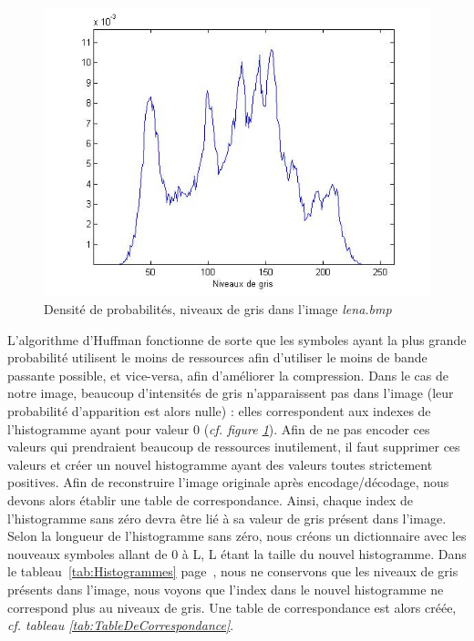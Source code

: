 \documentclass[a4paper, 12pt]{article}
\begin{document}
\begin{figure}[H]
\begin{center}
	 \includegraphics[scale=0.6]{../proba.jpg}
	 \caption{\label{probaGris} Densité de probabilités, niveaux de gris dans l'image \textit{lena.bmp}}
\end{center}
\end{figure}

L'algorithme d'Huffman fonctionne de sorte que les symboles ayant la plus grande probabilité utilisent le moins de ressources afin d'utiliser le moins de bande passante possible, et vice-versa, afin d'améliorer la compression. Dans le cas de notre image, beaucoup d'intensités de gris n'apparaissent pas dans l'image (leur probabilité d'apparition est alors nulle) : elles correspondent aux indexes de l'histogramme ayant pour valeur 0 (\textit{cf. figure \ref{probaGris}}). Afin de ne pas encoder ces valeurs qui prendraient beaucoup de ressources inutilement, il faut supprimer ces valeurs et créer un nouvel histogramme ayant des valeurs toutes strictement positives. Afin de reconstruire l'image originale après encodage/décodage, nous devons alors établir une table de correspondance. Ainsi, chaque index de l'histogramme sans zéro devra être lié à sa valeur de gris présent dans l'image. \\

Selon la longueur de l'histogramme sans zéro, nous créons un dictionnaire avec les nouveaux symboles allant de 0 à L, L étant la taille du nouvel histogramme. Dans le tableau~\ref{tab:Histogrammes} page~\pageref{tab:Histogrammes}, nous ne conservons que les niveaux de gris présents dans l'image, nous voyons que l'index dans le nouvel histogramme ne correspond plus au niveaux de gris. Une table de correspondance est alors créée, \textit{cf. tableau \ref{tab:TableDeCorrespondance}}. \\
\end{document}
